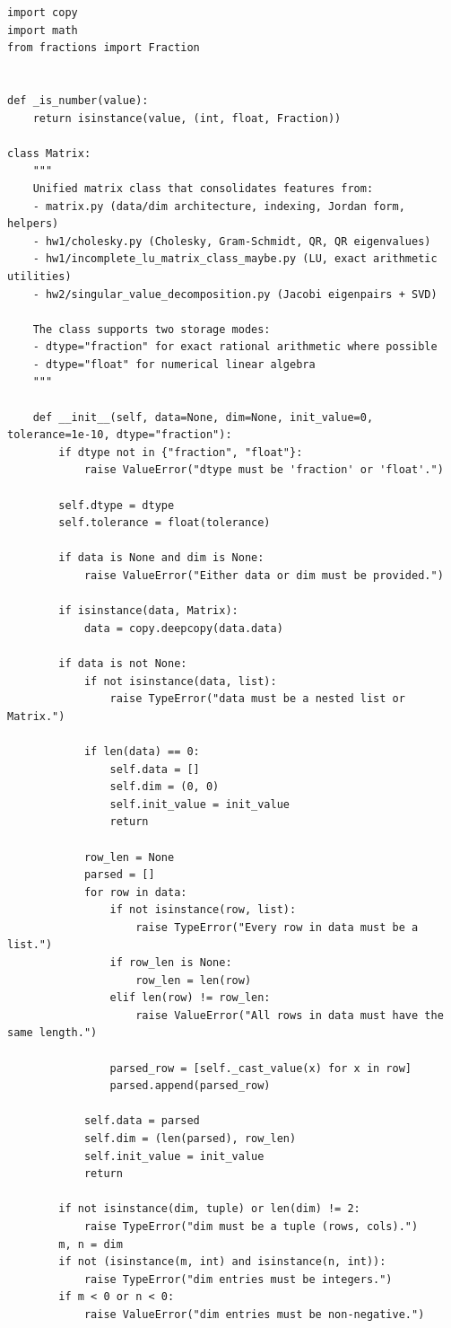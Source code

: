 \documentclass[UTF8,zihao=-4]{ctexart}
\begin{document}
\begin{lstlisting}[style=pycodestyle,caption={matlibrary.py 完整源码}]
import copy
import math
from fractions import Fraction


def _is_number(value):
	return isinstance(value, (int, float, Fraction))

class Matrix:
	"""
	Unified matrix class that consolidates features from:
	- matrix.py (data/dim architecture, indexing, Jordan form, helpers)
	- hw1/cholesky.py (Cholesky, Gram-Schmidt, QR, QR eigenvalues)
	- hw1/incomplete_lu_matrix_class_maybe.py (LU, exact arithmetic utilities)
	- hw2/singular_value_decomposition.py (Jacobi eigenpairs + SVD)

	The class supports two storage modes:
	- dtype="fraction" for exact rational arithmetic where possible
	- dtype="float" for numerical linear algebra
	"""

	def __init__(self, data=None, dim=None, init_value=0, tolerance=1e-10, dtype="fraction"):
		if dtype not in {"fraction", "float"}:
			raise ValueError("dtype must be 'fraction' or 'float'.")

		self.dtype = dtype
		self.tolerance = float(tolerance)

		if data is None and dim is None:
			raise ValueError("Either data or dim must be provided.")

		if isinstance(data, Matrix):
			data = copy.deepcopy(data.data)

		if data is not None:
			if not isinstance(data, list):
				raise TypeError("data must be a nested list or Matrix.")

			if len(data) == 0:
				self.data = []
				self.dim = (0, 0)
				self.init_value = init_value
				return

			row_len = None
			parsed = []
			for row in data:
				if not isinstance(row, list):
					raise TypeError("Every row in data must be a list.")
				if row_len is None:
					row_len = len(row)
				elif len(row) != row_len:
					raise ValueError("All rows in data must have the same length.")

				parsed_row = [self._cast_value(x) for x in row]
				parsed.append(parsed_row)

			self.data = parsed
			self.dim = (len(parsed), row_len)
			self.init_value = init_value
			return

		if not isinstance(dim, tuple) or len(dim) != 2:
			raise TypeError("dim must be a tuple (rows, cols).")
		m, n = dim
		if not (isinstance(m, int) and isinstance(n, int)):
			raise TypeError("dim entries must be integers.")
		if m < 0 or n < 0:
			raise ValueError("dim entries must be non-negative.")


\end{lstlisting}
\end{document}
